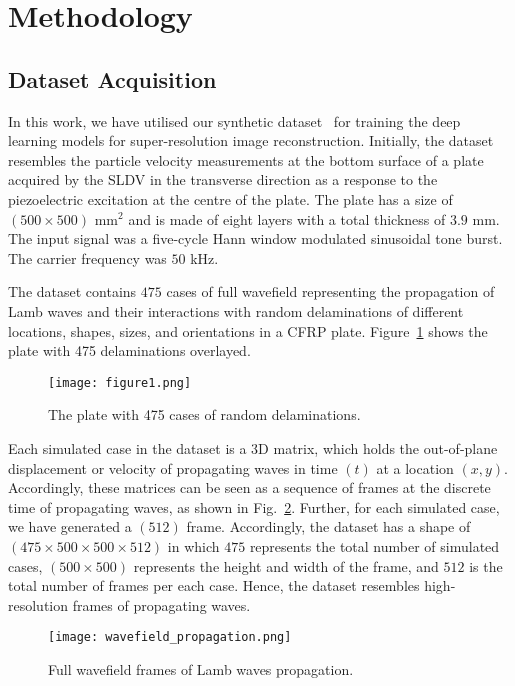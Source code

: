 \section{Methodology}
\subsection{Dataset Acquisition}
In this work, we have utilised our synthetic dataset~\cite{kudela_pawel_2021_5414555} for training the deep learning models for super-resolution image reconstruction.
Initially, the dataset resembles the particle velocity measurements at the bottom surface of a plate acquired by the SLDV in the transverse direction as a response to the piezoelectric excitation at the centre of the plate.
The plate has a size of \( (500\times500)\) mm\(^2\) and is made of eight layers with a total thickness of \(3.9\) mm.
The input signal was a five-cycle Hann window modulated sinusoidal tone burst. The carrier frequency was \(50\) kHz.

The dataset contains \(475\) cases of full wavefield representing the propagation of Lamb waves and their interactions with random delaminations of different locations, shapes, sizes, and orientations in a CFRP plate.
Figure~\ref{fig:All_cases} shows the plate with 475 delaminations overlayed.
\begin{figure} [!ht]
	\begin{center}
		\texttt{[image: figure1.png]}
	\end{center}
	\caption{The plate with 475 cases of random delaminations.} 
	\label{fig:All_cases}
\end{figure}

Each simulated case in the dataset is a 3D matrix, which holds the out-of-plane displacement or velocity of propagating waves in time \((t)\) at a location \((x,y)\). 
Accordingly, these matrices can be seen as a sequence of frames at the discrete time of propagating waves, as shown in Fig.~\ref{fig:wavefield_propagation}. 
Further, for each simulated case, we have generated a \((512)\) frame.
Accordingly, the dataset has a shape of \((475\times500\times500\times512)\) in which \(475\) represents the total number of simulated cases, \((500\times500)\) represents the height and width of the frame, and \(512\) is the total number of frames per each case.
Hence, the dataset resembles high-resolution frames of propagating waves.
\begin{figure}[!ht]
	\begin{center}
		\texttt{[image: wavefield\_propagation.png]}
	\end{center}
	\caption{Full wavefield frames of Lamb waves propagation.} 
	\label{fig:wavefield_propagation}
\end{figure}

